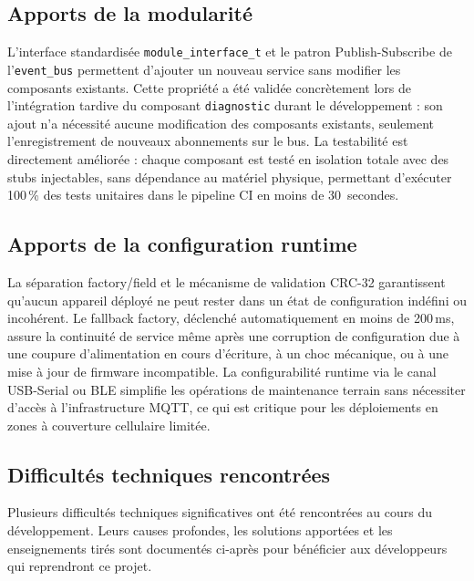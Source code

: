 \subsection*{Apports de la modularité}

L'interface standardisée \texttt{module\_interface\_t} et le patron
Publish-Subscribe de l'\texttt{event\_bus} permettent d'ajouter un
nouveau service sans modifier les composants existants. Cette propriété
a été validée concrètement lors de l'intégration tardive du composant
\texttt{diagnostic} durant le développement : son ajout n'a nécessité
aucune modification des composants existants, seulement l'enregistrement
de nouveaux abonnements sur le bus. La testabilité est directement
améliorée : chaque composant est testé en isolation totale avec des
stubs injectables, sans dépendance au matériel physique, permettant
d'exécuter 100\,\% des tests unitaires dans le pipeline CI en moins
de 30~secondes.

\subsection*{Apports de la configuration runtime}

La séparation factory/field et le mécanisme de validation CRC-32
garantissent qu'aucun appareil déployé ne peut rester dans un état
de configuration indéfini ou incohérent. Le fallback factory, déclenché
automatiquement en moins de 200\,ms, assure la continuité de service
même après une corruption de configuration due à une coupure
d'alimentation en cours d'écriture, à un choc mécanique, ou à une
mise à jour de firmware incompatible. La configurabilité runtime via
le canal USB-Serial ou BLE simplifie les opérations de maintenance
terrain sans nécessiter d'accès à l'infrastructure MQTT, ce qui est
critique pour les déploiements en zones à couverture cellulaire
limitée.

\subsection*{Difficultés techniques rencontrées}

Plusieurs difficultés techniques significatives ont été rencontrées
au cours du développement. Leurs causes profondes, les solutions
apportées et les enseignements tirés sont documentés ci-après pour
bénéficier aux développeurs qui reprendront ce projet.


